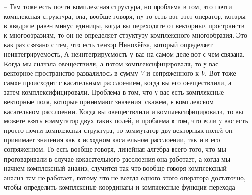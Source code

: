 \documentclass[a4paper, 12pt, oneside]{book}
\begin{document}
– Там тоже есть почти комплексная структура, но проблема в том, что почти
комплексная структура, она, вообще говоря, ну то есть вот этот оператор, которы
в квадрате равен минус единицы, когда вы переходите от векторных пространств
к многообразиям, то он не определяет структуру комплексного многообразия. Это
как раз связано с тем, что есть тензор Нинохёйза, который определяет неинтегрируемость,
А неинтегрируемость у вас на самом деле вот с чем связана. Когда мы сначала овеществили,
а потом комплексифицировали, то у вас векторное пространство развалилось в сумму $V$
и сопряженного к $V$. Вот тоже самое происходит с касательным расслоением, когда вы
его овеществлили, а затем комплексифицировали. Проблема в том, что у вас есть
комплексные векторные поля, которые принимают значения, скажем, в комплексном
касательном расслоении. Когда вы овеществлили и комплексифицировали, то вы можете
взять коммутатор двух таких полей, и проблема в том, что если у вас есть просто
почти комплексная структура, то коммутатор дву векторных полей он принимает
значения как в исходном касательном расслоении, так и в его сопряженном. То есть
вообще говоря, линейная алгебра всего того, что мы проговаривали в случае
кокасательного расслоения она работает, а когда мы начнем комплексный анализ,
случится так что вообще говоря комплексный анализ там не работает, потому что не
всегда одного этого оператора достаточно, чтобы определить комплексные координаты
и комплексные функции перехода.
\end{document}
